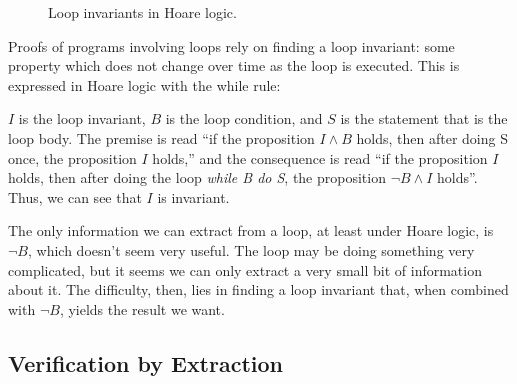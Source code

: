 \begin{figure}[t]
  \centering
  \begin{prooftree}



  \end{prooftree}
  \caption{Loop invariants in Hoare logic.}
  \label{fig:exmpl:lit-embedding-loop}
\end{figure}

Proofs of programs involving loops rely on finding a loop invariant:
some property which does not change over time as the loop is
executed\cite{Hoare69}. This is expressed in Hoare logic with the
while rule:

\begin{prooftree}
\end{prooftree}

$I$ is the loop invariant, $B$ is the loop condition, and $S$ is the
statement that is the loop body. The premise is read ``if the
proposition $I \land B$ holds, then after doing S once, the
proposition $I$ holds,'' and the consequence is read ``if the
proposition $I$ holds, then after doing the loop \textit{while B do
  S}, the proposition $\lnot B \land I$ holds''. Thus, we can see that
$I$ is invariant.

The only information we can extract from a loop, at least under Hoare
logic, is $\lnot B$, which doesn't seem very useful. The loop may be
doing something very complicated, but it seems we can only extract a
very small bit of information about it. The difficulty, then, lies in
finding a loop invariant that, when combined with $\lnot B$, yields
the result we want.

\subsection{Verification by Extraction}
\label{sec:lit-verification-extraction}

